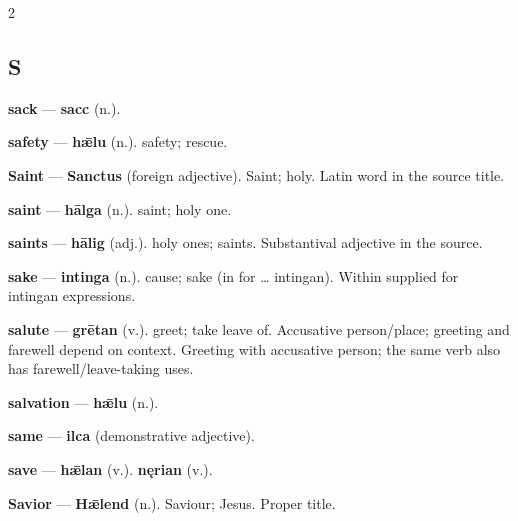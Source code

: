 \begin{multicols}{2}
\subsection*{S}
\textbf{sack} — \textbf{sacc} (n.).\par
\textbf{safety} — \textbf{hǣlu} (n.). safety; rescue.\par
\textbf{Saint} — \textbf{Sanctus} (foreign adjective). Saint; holy. Latin word in the source title.\par
\textbf{saint} — \textbf{hālga} (n.). saint; holy one.\par
\textbf{saints} — \textbf{hālig} (adj.). holy ones; saints. Substantival adjective in the source.\par
\textbf{sake} — \textbf{intinga} (n.). cause; sake (in for … intingan). Within supplied for intingan expressions.\par
\textbf{salute} — \textbf{grētan} (v.). greet; take leave of. Accusative person/place; greeting and farewell depend on context. Greeting with accusative person; the same verb also has farewell/leave-taking uses.\par
\textbf{salvation} — \textbf{hǣlu} (n.).\par
\textbf{same} — \textbf{ilca} (demonstrative adjective).\par
\textbf{save} — \textbf{hǣlan} (v.).  \textbf{nęrian} (v.).\par
\textbf{Savior} — \textbf{Hǣlend} (n.). Saviour; Jesus. Proper title.\par

\end{multicols}
